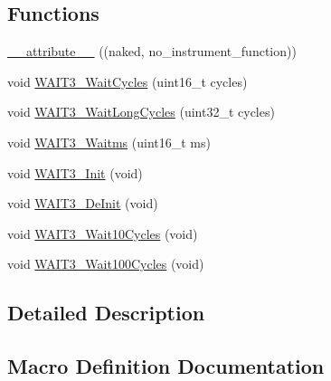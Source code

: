 \subsection*{Functions}
\begin{DoxyCompactItemize}
\item 
\hyperlink{group___w_a_i_t3__module_ga0d401ca6ca297b5b7a450deed0c42b78}{\+\_\+\+\_\+attribute\+\_\+\+\_\+} ((naked, no\+\_\+instrument\+\_\+function))
\item 
void \hyperlink{group___w_a_i_t3__module_gafe55719ed56a2c5bfe22f44d9825e7e3}{W\+A\+I\+T3\+\_\+\+Wait\+Cycles} (uint16\+\_\+t cycles)
\item 
void \hyperlink{group___w_a_i_t3__module_gadb969068f60f32c403871592e09be7e8}{W\+A\+I\+T3\+\_\+\+Wait\+Long\+Cycles} (uint32\+\_\+t cycles)
\item 
void \hyperlink{group___w_a_i_t3__module_ga19ada606148b3ddfb0bce574e8932ae8}{W\+A\+I\+T3\+\_\+\+Waitms} (uint16\+\_\+t ms)
\item 
void \hyperlink{group___w_a_i_t3__module_ga353edcbbc79c1cbb12d36df1a9c1cb16}{W\+A\+I\+T3\+\_\+\+Init} (void)
\item 
void \hyperlink{group___w_a_i_t3__module_ga000a29faa624093830f42e27bde927df}{W\+A\+I\+T3\+\_\+\+De\+Init} (void)
\item 
void \hyperlink{group___w_a_i_t3__module_ga37d600b93a863c8097cf3950901093e8}{W\+A\+I\+T3\+\_\+\+Wait10\+Cycles} (void)
\item 
void \hyperlink{group___w_a_i_t3__module_gad8a558a0bb022ce7e66fee0b7d53c088}{W\+A\+I\+T3\+\_\+\+Wait100\+Cycles} (void)
\end{DoxyCompactItemize}


\subsection{Detailed Description}


\subsection{Macro Definition Documentation}
\mbox{\label{group___w_a_i_t3__module_ga704e840528cb3515b38c088da7dcf5e7}} 
